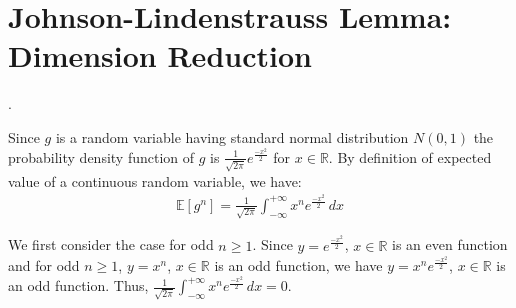 \section{Johnson-Lindenstrauss Lemma: Dimension Reduction}
. 

Since $g$ is a random variable having standard normal distribution $N(0,1)$
the probability density function of $g$ is $\frac{1}{\sqrt{2\pi}}e^{\frac{-x^2}{2}}$ for $x\in \mathbb{R}$.
By definition of expected value of a continuous random variable, we have:
\begin{align}
    \nonumber \mathbb{E}[g^n]=\frac{1}{\sqrt{2\pi}}\int_{-\infty }^{+\infty }x^ne^{\frac{-x^2}{2}}\,dx 
\end{align}

We first consider the case for odd $n\ge 1$.
Since $y=e^{\frac{-x^2}{2}}$, $x\in \mathbb{R}$ is an even function
and for odd $n\ge 1$, $y=x^n$, $x\in \mathbb{R}$  is an odd function, we have $y=x^ne^{\frac{-x^2}{2}}$, $x\in \mathbb{R}$  is an odd function.
Thus, $\frac{1}{\sqrt{2\pi}}\int_{-\infty }^{+\infty }x^ne^{\frac{-x^2}{2}}\,dx =0$. 

